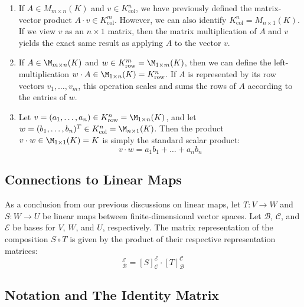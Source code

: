 \begin{enumerate}
    \item If $A \in M_{m \times n}(K)$ and $v \in K_{\text{col}}^{n}$, we have previously defined the matrix-vector product $A \cdot v \in K_{\text{col}}^{m}$. However, we can also identify $K_{\text{col}}^{n} = M_{n \times 1}(K)$. If we view $v$ as an $n \times 1$ matrix, then the matrix multiplication of $A$ and $v$ yields the exact same result as applying $A$ to the vector $v$.
    
    \item If $A \in \M_{m \times n}(K)$ and $w \in K_{\text{row}}^{m} = \M_{1 \times m}(K)$, then we can define the left-multiplication $w \cdot A \in \M_{1 \times n}(K) = K_{\text{row}}^{n}$. If $A$ is represented by its row vectors $v_1, \dots, v_m$, this operation scales and sums the rows of $A$ according to the entries of $w$.
    
    \item Let $v = (a_1, \dots, a_n) \in K_{\text{row}}^{n} = \M_{1 \times n}(K)$, and let $w = (b_1, \dots, b_n)^T \in K_{\text{col}}^{n} = \M_{n \times 1}(K)$. Then the product $v \cdot w \in \M_{1 \times 1}(K) = K$ is simply the standard scalar product:
    \begin{equation*}
        v \cdot w = a_1 b_1 + \dots + a_n b_n
    \end{equation*}
\end{enumerate}

\subsection{Connections to Linear Maps}

As a conclusion from our previous discussions on linear maps, let $T: V \to W$ and $S: W \to U$ be linear maps between finite-dimensional vector spaces. Let $\mathcal{B}$, $\mathcal{C}$, and $\mathcal{E}$ be bases for $V$, $W$, and $U$, respectively. The matrix representation of the composition $S \circ T$ is given by the product of their respective representation matrices:
\begin{equation*}
    [S \circ T]_{\mathcal{B}}^{\mathcal{E}} = [S]_{\mathcal{C}}^{\mathcal{E}} \cdot [T]_{\mathcal{B}}^{\mathcal{C}}
\end{equation*}

\subsection{Notation and The Identity Matrix}

